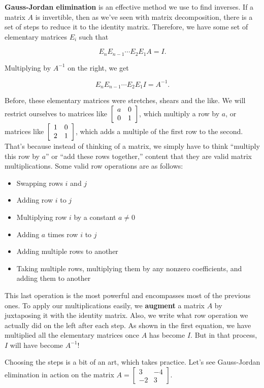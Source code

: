 \documentclass[../gatm.tex]{subfiles}
\begin{document}
\noindent\textbf{Gauss-Jordan elimination} is an effective method we use to find inverses. If a matrix $A$ is invertible, then as we've seen with matrix decomposition, there is a set of steps to reduce it to the identity matrix. Therefore, we have some set of elementary matrices $E_i$ such that

$$E_nE_{n-1}\cdots E_2E_1A=I.$$

\noindent Multiplying by $A^{-1}$ on the right, we get

$$E_nE_{n-1}\cdots E_2E_1I=A^{-1}.$$

\noindent Before, these elementary matrices were stretches, shears and the like. We will restrict ourselves to matrices like $\left[\begin{array}{cc} a & 0 \\ 0 & 1 \end{array}\right]$, which multiply a row by $a$, or matrices like $\left[\begin{array}{cc} 1 & 0 \\ 2 & 1 \end{array}\right]$, which adds a multiple of the first row to the second. That's because instead of thinking of a matrix, we simply have to think ``multiply this row by $a$'' or ``add these rows together,'' content that they are valid matrix multiplications. Some valid row operations are as follows:

\begin{itemize}
\item Swapping rows $i$ and $j$
\item Adding row $i$ to $j$
\item Multiplying row $i$ by a constant $a\neq 0$
\item Adding $a$ times row $i$ to $j$
\item Adding multiple rows to another
\item Taking multiple rows, multiplying them by any nonzero coefficients, and adding them to another
\end{itemize}

\noindent This last operation is the most powerful and encompasses most of the previous ones. To apply our multiplications easily, we \textbf{augment} a matrix $A$ by juxtaposing it with the identity matrix. Also, we write what row operation we actually did on the left after each step. As shown in the first equation, we have multiplied all the elementary matrices once $A$ has become $I$. But in that process, $I$ will have become $A^{-1}$!

Choosing the steps is a bit of an art, which takes practice. Let's see Gauss-Jordan elimination in action on the matrix $A=\left[\begin{smallmatrix}3 & -4 \\ -2 & 3\end{smallmatrix}\right]$.
\end{document}
